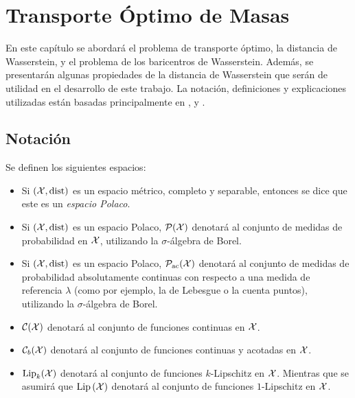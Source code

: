 \chapter{Transporte Óptimo de Masas}\label{chap:transporte-optimo-de-masas}
{

	En este capítulo se abordará el problema de transporte óptimo, la distancia de Wasserstein, y el problema de los baricentros de Wasserstein. Además, se presentarán algunas propiedades de la distancia de Wasserstein que serán de utilidad en el desarrollo de este trabajo. La notación, definiciones y explicaciones utilizadas están basadas principalmente en \cite{villani2009optimal}, \cite{peyre2019computational} y \cite{panaretos2020invitation}.

	\section*{Notación}\label{sec:notacion}
	{
		\begin{definition}
			Se definen los siguientes espacios:
			\begin{itemize}
				\item Si $(\cX, \dist)$ es un espacio métrico, completo y separable, entonces se dice que este es un \emph{espacio Polaco}.
				\item Si $(\cX, \dist)$ es un espacio Polaco, $\ProbSpace[\cX]$ denotará al conjunto de medidas de probabilidad en $\cX$, utilizando la $\sigma$-álgebra de Borel.
				\item Si $(\cX, \dist)$ es un espacio Polaco, $\ProbSpaceAC[\cX]$ denotará al conjunto de medidas de probabilidad absolutamente continuas con respecto a una medida de referencia $\lambda$ (como por ejemplo, la de Lebesgue o la cuenta puntos), utilizando la $\sigma$-álgebra de Borel.
				\item $\mathcal{C}(\cX)$ denotará al conjunto de funciones continuas en $\cX$.
				\item $\mathcal{C}_b(\cX)$ denotará al conjunto de funciones continuas y acotadas en $\cX$.
				\item ${\Lip}_{k}(\cX)$ denotará al conjunto de funciones $k$-Lipschitz en $\cX$. Mientras que se asumirá que $\Lip[\cX]$ denotará al conjunto de funciones $1$-Lipschitz en $\cX$. 
			\end{itemize}
		\end{definition}

}}

